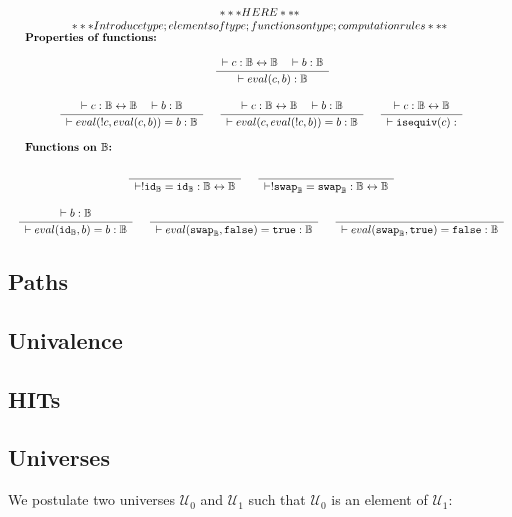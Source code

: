 \documentclass[format=acmlarge,review,natbib]{acmart}
\newcommand{\invc}[1]{!#1}
\newcommand{\evalone}[2]{eval(#1,#2)}
\newcommand{\isequiv}[1]{\mathtt{isequiv}(#1)}
\newcommand{\idc}{\mathtt{id}}
\newcommand{\swapc}{\mathtt{swap}}
\newcommand{\iso}{\leftrightarrow}
\newcommand{\fc}{\mathtt{false}}
\newcommand{\tc}{\mathtt{true}}
\newcommand{\boolt}{\mathbb{B}}
\newcommand{\uzero}{\mathcal{U}_0}
\newcommand{\uone}{\mathcal{U}_1}
\newcommand{\Rule}[2]{
\makebox{
$\displaystyle
\frac{\begin{array}{l}#1\\\end{array}}
{\begin{array}{l}#2\\\end{array}}$}}
\newcommand{\proves}{\vdash}
\newcommand{\jdg}[3]{#1 \proves #2 : #3}
\begin{document}
\[\begin{array}{c}
***HERE*** \\
*** Introduce type; elements of type; functions on type; computation rules *** \\
\noalign{\textbf{Properties of functions:}} \\
\quad
\quad
\Rule{\jdg{}{c}{\boolt\iso\boolt}
         \quad\jdg{}{b}{\boolt}}
        {\jdg{}{\evalone{c}{b}}{\boolt}}
\\
\\
\Rule{\jdg{}{c}{\boolt\iso\boolt}
         \quad\jdg{}{b}{\boolt}}
        {\jdg{}{\evalone{\invc{c}}{\evalone{c}{b}} = b}{\boolt}}
\quad
\Rule{\jdg{}{c}{\boolt\iso\boolt}
         \quad\jdg{}{b}{\boolt}}
        {\jdg{}{\evalone{c}{\evalone{\invc{c}}{b}} = b}{\boolt}}
\quad
\Rule{\jdg{}{c}{\boolt\iso\boolt}}
        {\jdg{}{\isequiv{c}}{}}
\\
\\
\noalign{\textbf{Functions on $\boolt$:}} \\
\Rule{}{\jdg{}{\invc{\idc_{\boolt} = \idc_{\boolt}}}{\boolt\iso\boolt}}
\quad
\Rule{}{\jdg{}{\invc{\swapc _{\boolt}} = \swapc _{\boolt}}{\boolt\iso\boolt}}
\\
\\
\Rule{\jdg{}{b}{\boolt}}
        {\jdg{}{\evalone{\idc_{\boolt}}{b} = b}{\boolt}}
\quad
\Rule{}
        {\jdg{}{\evalone{\swapc_{\boolt}}{\fc} = \tc}{\boolt}}
\quad
\Rule{}
        {\jdg{}{\evalone{\swapc_{\boolt}}{\tc} = \fc}{\boolt}}
\end{array}\]

\subsection{Paths}

\subsection{Univalence}

\subsection{HITs}

\newpage

\subsection{Universes}

We postulate two universes $\uzero$ and $\uone$ such that $\uzero$ is an element
of $\uone$:
\end{document}
